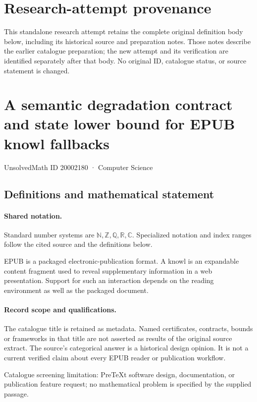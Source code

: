 \documentclass[11pt]{article}
\begin{document}
\section*{Research-attempt provenance}
This standalone research attempt retains the complete original definition body below,
including its historical source and preparation notes. Those notes describe the
earlier catalogue preparation; the new attempt and its verification are identified
separately after that body. No original ID, catalogue status, or source statement is changed.

\section{A semantic degradation contract and state lower bound for EPUB knowl fallbacks}\label{20002180}
{\small UnsolvedMath ID 20002180 · Computer Science}
\subsection{Definitions and mathematical statement}

\paragraph{Shared notation.}Standard number systems are $\mathbb N,\mathbb Z,\mathbb Q,\mathbb R,\mathbb C$. Specialized notation and index ranges follow the cited source and the definitions below.


EPUB is a packaged electronic-publication format. A knowl is an expandable content fragment used to reveal supplementary information in a web presentation. Support for such an interaction depends on the reading environment as well as the packaged document.
\paragraph{Record scope and qualifications.}
The catalogue title is retained as metadata. Named certificates, contracts, bounds or frameworks in that title are not asserted as results of the original source extract.
The source's categorical answer is a historical design opinion. It is not a current verified claim about every EPUB reader or publication workflow.

Catalogue screening limitation: PreTeXt software design, documentation, or publication feature request; no mathematical problem is specified by the supplied passage.
\end{document}

